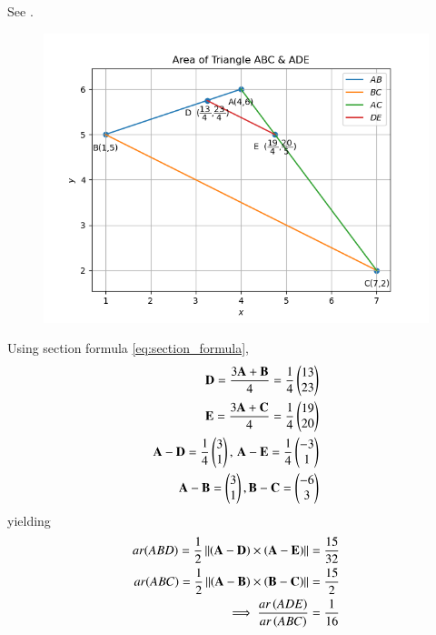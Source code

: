 See  
.
\begin{figure}[!h]
 \begin{center}
 \includegraphics[width=\columnwidth]{chapters/10/7/4/6/figs/fig.png}
 \end{center}
\caption{}
\label{fig:chapters/10/7/4/6Fig1}
\end{figure}
	Using section formula
	  \eqref{eq:section_formula},
\begin{align}
\mathbf{D} =\frac{3\mathbf{A}+\mathbf{B}}{4}
	=\frac{1}{4}\begin{pmatrix}13\\ 23\end{pmatrix}
	\\
\mathbf{E} =\frac{3\mathbf{A}+\mathbf{C}}{4}
	=\frac{1}{4}\begin{pmatrix}19\\ 20\end{pmatrix}
	\\
	\mathbf{A}- \mathbf{D} 
	=\frac{1}{4}\begin{pmatrix}3\\ 1\end{pmatrix},\,
	  \mathbf{A}- \mathbf{E}  
	=\frac{1}{4}\begin{pmatrix}-3\\ 1\end{pmatrix}
	\\
	\mathbf{A}- \mathbf{B} =\begin{pmatrix}3\\1\end{pmatrix},
	  \mathbf{B}-\mathbf{C} =\begin{pmatrix}-6\\3\end{pmatrix}
\end{align}
yielding
\begin{align}
ar(ABD) =\frac{1}{2} \left\lVert\left(\mathbf{A}-\mathbf{D}\right)  \times 
   \left(\mathbf{A}- \mathbf{E}\right)\right\rVert 
	=	\frac{15}{32}
	\\
	  ar(ABC) =\frac{1}{2} \left\lVert\left(\mathbf{A}-\mathbf{B}\right)  \times 
   \left(\mathbf{B}- \mathbf{C}\right)\right\rVert 
	=	\frac{15}{2}
	\\
	\implies \frac{ar\left(ADE\right)}{ar\left(ABC\right)}=\frac{1}{16}
\end{align}
